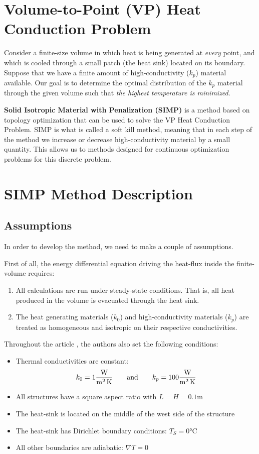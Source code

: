 \documentclass[11pt]{article}
\begin{document}
\section*{Volume-to-Point (VP) Heat Conduction Problem}

Consider a finite-size volume in which heat is being generated at \textit{every} point, and which is cooled through a small patch (the heat sink) located on its boundary. Suppose that we have a finite amount of high-conductivity ($k_p$) material available. Our goal is to determine the optimal distribution of the $k_p$ material through the given volume such that \textit{the highest temperature is minimized}.

{\color{tiananmen}\textbf{Solid Isotropic Material with Penalization (SIMP)}} is a method based on topology optimization that can be used to solve the VP Heat Conduction Problem. SIMP is what is called a {\color{baystate}soft kill method}, meaning that in each step of the method we increase or decrease high-conductivity material by a small quantity. This allows us to methods designed for continuous optimization problems for this discrete problem.

\section*{SIMP Method Description}

\subsection*{Assumptions}
In order to develop the method, we need to make a couple of assumptions.

First of all, the energy differential equation driving the heat-flux inside the finite-volume requires:
\begin{enumerate}
	\item All calculations are run under {\color{baystate}steady-state conditions}. That is, all heat produced in the volume is evacuated through the heat sink.
	\item The heat generating materials ($k_0$) and high-conductivity materials ($k_p$) are treated as {\color{baystate}homogeneous} and {\color{baystate}isotropic} on their respective conductivities.
\end{enumerate}

Throughout the article \cite{Marck2012}, the authors also set the following conditions:
\begin{itemize}
	\item Thermal conductivities are constant:
	$$k_0=1 \si[per-mode=fraction]{\watt\per\square\meter\per\kelvin}\qquad\text{and}\qquad k_p=100 \si[per-mode=fraction]{\watt\per\square\meter\per\kelvin}$$
	\item All structures have a square aspect ratio with $L=H=0.1\si{\meter}$
	\item The heat-sink is located on the middle of the west side of the structure
	\item The heat-sink has Dirichlet boundary conditions: $T_S=0\si{\celsius}$
	\item All other boundaries are adiabatic: $\nabla T=0$
\end{itemize}
\end{document}
